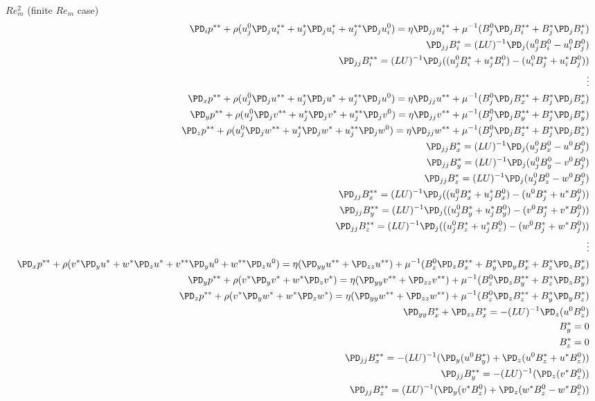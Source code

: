 \documentclass[11pt]{article}
\begin{document}
\newpage
$Re_m^2$ (finite $Re_m$ case)
\begin{equation}\begin{aligned}
\PD_i p^{**} + \rho (u_j^0 \PD_j u_i^{**} + u_j^* \PD_j u_i^* + u_j^{**} \PD_j u_i^0) = \eta \PD_{jj} u_i^{**} + \mu^{-1} (B_j^0 \PD_j B_i^{**} + B_j^* \PD_j B_i^*) \\
\PD_{jj} B_i^* = (LU)^{-1} \PD_j (u_j^0 B_i^0 - u_i^0 B_j^0) \\
\PD_{jj} B_i^{**} = (LU)^{-1} \PD_j ((u_j^0 B_i^*+u_j^* B_i^0) - (u_i^0 B_j^*+u_i^* B_j^0)) \\
\vdots \\
\PD_x p^{**} + \rho (u_j^0 \PD_j u^{**} + u_j^* \PD_j u^* + u_j^{**} \PD_j u^0) = \eta \PD_{jj} u^{**} + \mu^{-1} (B_j^0 \PD_j B_x^{**} + B_j^* \PD_j B_x^*) \\
\PD_y p^{**} + \rho (u_j^0 \PD_j v^{**} + u_j^* \PD_j v^* + u_j^{**} \PD_j v^0) = \eta \PD_{jj} v^{**} + \mu^{-1} (B_j^0 \PD_j B_y^{**} + B_j^* \PD_j B_y^*) \\
\PD_z p^{**} + \rho (u_j^0 \PD_j w^{**} + u_j^* \PD_j w^* + u_j^{**} \PD_j w^0) = \eta \PD_{jj} w^{**} + \mu^{-1} (B_j^0 \PD_j B_z^{**} + B_j^* \PD_j B_z^*) \\
\PD_{jj} B_x^* = (LU)^{-1} \PD_j (u_j^0 B_x^0 - u^0 B_j^0) \\
\PD_{jj} B_y^* = (LU)^{-1} \PD_j (u_j^0 B_y^0 - v^0 B_j^0) \\
\PD_{jj} B_z^* = (LU)^{-1} \PD_j (u_j^0 B_z^0 - w^0 B_j^0) \\
\PD_{jj} B_x^{**} = (LU)^{-1} \PD_j ((u_j^0 B_x^*+u_j^* B_x^0) - (u^0 B_j^*+u^* B_j^0)) \\
\PD_{jj} B_y^{**} = (LU)^{-1} \PD_j ((u_j^0 B_y^*+u_j^* B_y^0) - (v^0 B_j^*+v^* B_j^0)) \\
\PD_{jj} B_z^{**} = (LU)^{-1} \PD_j ((u_j^0 B_z^*+u_j^* B_z^0) - (w^0 B_j^*+w^* B_j^0)) \\
\vdots \\
\PD_x p^{**} + \rho (v^* \PD_y u^* + w^* \PD_z u^* + v^{**} \PD_y u^0 + w^{**} \PD_z u^0) = \eta (\PD_{yy} u^{**} + \PD_{zz} u^{**}) + \mu^{-1} (B_z^0 \PD_z B_x^{**} + B_y^* \PD_y B_x^* + B_z^* \PD_z B_x^*) \\
\PD_y p^{**} + \rho (v^* \PD_y v^* + w^* \PD_z v^*) = \eta (\PD_{yy} v^{**} + \PD_{zz} v^{**}) + \mu^{-1} (B_z^0 \PD_z B_y^{**} + B_z^* \PD_z B_y^*) \\
\PD_z p^{**} + \rho (v^* \PD_y w^* + w^* \PD_z w^*) = \eta (\PD_{yy} w^{**} + \PD_{zz} w^{**}) + \mu^{-1} (B_z^0 \PD_z B_z^{**} + B_y^* \PD_y B_z^*) \\
\PD_{yy} B_x^* + \PD_{zz} B_x^* = - (LU)^{-1} \PD_z (u^0 B_z^0) \\
B_y^* = 0 \\
B_z^* = 0 \\
\PD_{jj} B_x^{**} =-(LU)^{-1} (\PD_y (u^0 B_y^*) + \PD_z (u^0 B_z^*+u^* B_z^0)) \\
\PD_{jj} B_y^{**} =-(LU)^{-1} (\PD_z (v^* B_z^0)) \\
\PD_{jj} B_z^{**} = (LU)^{-1} (\PD_y (v^* B_z^0) + \PD_z (w^* B_z^0 - w^* B_z^0)) \\
\end{aligned}\end{equation}
\end{document}
